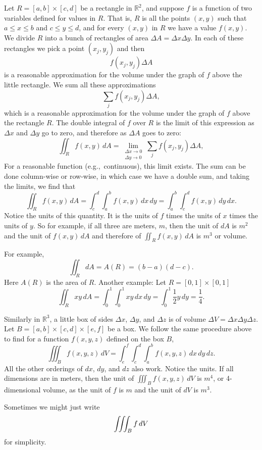 \documentclass[12pt]{article}
\newcommand{\R}{{\mathbb{R}}}
\newcommand{\avoidbreak}{\postdisplaypenalty=100}
\begin{document}
Let $R = [a,b] \times [c,d]$ be a rectangle in $\R^2$, and suppose
$f$ is a function of two variables defined for values in $R$.
That is, $R$ is all the points
$(x,y)$ such that $a \leq x \leq b$ and $c \leq y \leq d$,
and for every $(x,y)$ in $R$ we have a value $f(x,y)$.
We divide $R$ into a bunch of rectangles of area $\Delta A = \Delta x \Delta y$.
In each of these rectangles we pick a point $(x_j,y_j)$ and then
\[
f(x_j,y_j) \Delta A
\]
is a reasonable approximation for the volume under the graph of $f$ above the little
rectangle.
We sum all these approximations
\[
\sum_j 
f(x_j,y_j) \Delta A ,
\]
which is a reasonable approximation for the volume under the graph of $f$ above the rectangle
$R$.
The double integral of $f$ over $R$ is the limit of
this expression
as $\Delta x$ and $\Delta y$ go to zero,
and therefore as $\Delta A$ goes to zero:
\[
\iint_R f(x,y) \, dA =
\lim_{\substack{\Delta x \to 0 \\ \Delta y \to 0}}
\sum_j 
f(x_j,y_j) \Delta A ,
\]
For a reasonable function (e.g.,\ continuous), this limit exists.
The sum can be done column-wise or row-wise, in which case we have a
double sum, and taking the limits, we find that
\[
\iint_R f(x,y) \, dA
=
\int_c^d \int_a^b f(x,y) \, dx \, dy
=
\int_a^b \int_c^d f(x,y) \, dy \, dx .
\]
Notice the units of this quantity.  It is the units of $f$ times the units of $x$ times
the units of $y$.  So for example, if all three are meters, $\unit{m}$,
then the unit of $dA$ is $\unit{m^2}$ and
the unit of
$f(x,y) \, dA$
and therefore of
$\iint_R f(x,y) \, dA$
is $\unit{m^3}$ or volume.

For example,
\[
\iint_R dA = A(R) = (b-a)(d-c) .
\]
Here $A(R)$ is the area of $R$.  Another example:  Let $R = [0,1] \times [0,1]$
\[
\iint_R xy\, dA =
\int_0^1 \int_0^1 xy \, dx \, dy
=
\int_0^1 \frac{1}{2} y \, dy
= \frac{1}{4}.
\]

Similarly in $\R^3$, a little box of sides $\Delta x$, $\Delta y$, and $\Delta z$
is of volume $\Delta V = \Delta x \Delta y \Delta z$.  
Let $B = [a,b] \times [c,d] \times [e,f]$ be a box.
We follow the same procedure above to find for a function $f(x,y,z)$
defined on the box $B$,
\[
\iiint_B f(x,y,z) \, dV
=
\int_e^f \int_c^d \int_a^b f(x,y,z) \, dx \, dy \, dz .
\]
All the other orderings of $dx$, $dy$, and $dz$ also work.
Notice the units.  If all dimensions are in meters, then
the unit of
$\iiint_B f(x,y,z) \, dV$ is $\unit{m^4}$, or 4-dimensional volume,
as the unit of $f$ is $\unit{m}$ and the unit of $dV$ is $\unit{m^3}$.

Sometimes we might just write
\[
\iiint_B f \, dV
\avoidbreak
\]
for simplicity.
\end{document}

